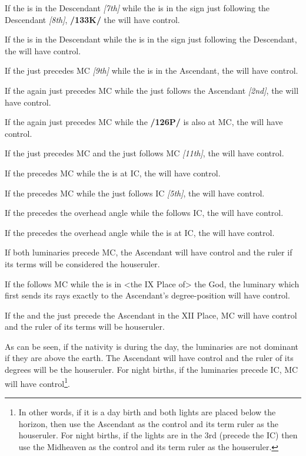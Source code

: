If the \Sun\xspace is in the Descendant \textsl{[7th]} while the \Moon\xspace is in the sign just following the Descendant \textsl{[8th]}, \textbf{/133K/} the \Sun\xspace will have control. 

If the \Moon\xspace is in the Descendant while the \Sun\xspace is in the sign just following the Descendant, the \Sun\xspace will have control. 

If the \Sun\xspace just precedes MC \textsl{[9th]} while the \Moon\xspace is in the Ascendant, the \Moon\xspace will have control. 

If the \Sun\xspace again just precedes MC while the \Moon\xspace just follows the Ascendant \textsl{[2nd]}, the \Moon\xspace will have control. 

If the \Sun\xspace again just precedes MC while the \Moon\xspace \textbf{/126P/} is also at MC, the \Moon\xspace will have control. 

If the \Sun\xspace just precedes MC and the \Moon\xspace just follows MC \textsl{[11th]}, the \Moon\xspace will have control. 

If the \Moon\xspace precedes MC while the \Sun\xspace is at IC, the \Sun\xspace will have control. 

If the \Moon\xspace precedes MC while the \Sun\xspace just follows IC \textsl{[5th]}, the \Sun\xspace will have control. 

If the \Sun\xspace precedes the overhead angle while the \Moon\xspace follows IC, the \Moon\xspace will have control. 

If the \Sun\xspace precedes the overhead angle while the \Moon\xspace is at IC, the \Moon\xspace will have control. 

If both luminaries precede MC, the Ascendant will have control and the ruler if its terms will be considered the houseruler. 

If the \Moon\xspace follows MC while the \Sun\xspace is in <the IX Place of> the God, the luminary which first sends its rays exactly to the Ascendant’s degree-position will have control. 

If the \Sun\xspace and the \Moon\xspace just precede the Ascendant in the XII Place, MC will have control and the ruler of its terms will be houseruler.

As can be seen, if the nativity is during the day, the luminaries are not dominant if they are above the earth. The Ascendant will have control and the ruler of its degrees will be the houseruler. For night births, if the luminaries precede IC, MC will have control\footnote{In other words, if it is a day birth and both lights are placed below the horizon, then use the Ascendant as the control and its term ruler as the houseruler. For night births, if the lights are in the 3rd (precede the IC) then use the Midheaven as the control and its term ruler as the houseruler.}.

